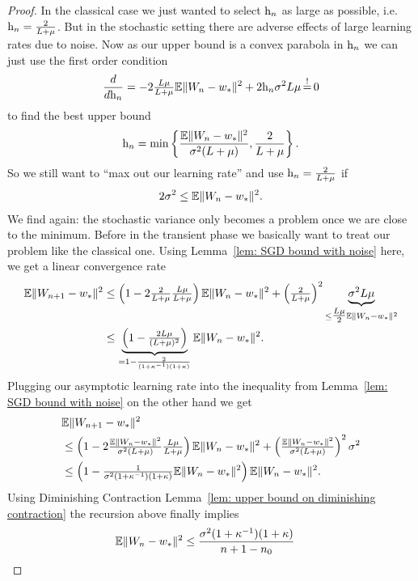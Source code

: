\begin{proof}
	In the classical case we just wanted to select \(\text{h}_n\) as large as possible,
	i.e. \(\text{h}_n=\tfrac{2}{L+\mu}\). But in the stochastic setting there
	are adverse effects of large learning rates due to noise. Now as our upper bound
	is a convex parabola in \(\text{h}_n\) we can just use the first order condition
	\begin{align*}
		\frac{d}{d\lr_n}
		= -2\tfrac{\ubound\lbound}{\ubound+\lbound}
		\E\|\Weights_n - \minimum\|^2 + 2\lr_n \stdBound^2\ubound\lbound
		\xeq{!} 0
	\end{align*}
	to find the best upper bound
	\begin{align}\label{eq: optimal learning rate SGD}
		\text{h}_n
		= \min\left\{
			\frac{\mathbb{E}\|W_n - w_*\|^2}{\sigma^2(L+\mu)},
			\frac{2}{L+\mu}
		\right\}.
	\end{align}
	So we still want to ``max out our learning rate'' and use
	\(\text{h}_n=\tfrac{2}{L+\mu}\) if
	\begin{align*}
		2\sigma^2 \le \mathbb{E}\|W_n - w_*\|^2.
	\end{align*}
	We find again: the stochastic variance only becomes a problem once we are
	close to the minimum. Before in the transient phase we basically want to
	treat our problem like the classical one. Using Lemma~\ref{lem: SGD bound
	with noise} here, we get a linear convergence rate
	\begin{align*}
		\mathbb{E}\|W_{n+1} - w_*\|^2
		&\le \left(1-2\tfrac{2}{L+\mu}\tfrac{L\mu}{L+\mu}\right)
		\mathbb{E}\|W_n - w_*\|^2 + \left(\tfrac{2}{L+\mu}\right)^2
		\underbrace{\sigma^2L\mu}_{
			\le\tfrac{L\mu}{2} \mathbb{E}\|W_n - w_*\|^2
		}\\
		&\le \underbrace{
			\left(1-\tfrac{2L\mu}{(L+\mu)^2}\right)
		}_{
			=1-\frac{2}{(1+\kappa^{-1})(1+\kappa)}
		}
		\mathbb{E}\|W_n - w_*\|^2.
	\end{align*}
	Plugging our asymptotic learning rate into the inequality from Lemma~\ref{lem: SGD bound with noise}
	on the other hand we get
	\begin{align*}
		&\mathbb{E}\|W_{n+1} - w_*\|^2\\
		&\le \left(1-2
			\tfrac{\mathbb{E}\|W_n - w_*\|^2}{\sigma^2(L+\mu)}
			\tfrac{L\mu}{L+\mu}
		\right)
		\mathbb{E}\|W_n - w_*\|^2
		+ \left(
			\tfrac{\mathbb{E}\|W_n - w_*\|^2}{\sigma^2(L+\mu)}
		\right)^2
		\sigma^2\\
		&\le \left(1-
			\tfrac{1}{\sigma^2(1+\kappa^{-1})(1+\kappa)}
			\mathbb{E}\|W_n - w_*\|^2
		\right)
		\mathbb{E}\|W_n - w_*\|^2.
	\end{align*}
	Using Diminishing Contraction Lemma~\ref{lem: upper bound on diminishing
	contraction} the recursion above finally implies
	\begin{align*}
		\mathbb{E}\|W_n - w_*\|^2
		&\le \frac{\sigma^2(1+\kappa^{-1})(1+\kappa)}{n+1-n_0}
		\qedhere
	\end{align*}
\end{proof}

